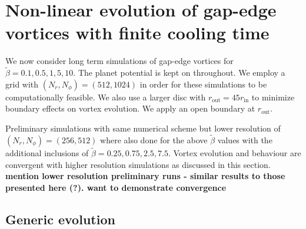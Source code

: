 
\section{Non-linear evolution of
  gap-edge vortices with finite cooling time}\label{nonlinear} 

We now consider long term simulations of gap-edge vortices for
$\tilde{\beta}=0.1,0.5,1,5,10$. The planet potential is kept on
throughout.  
We employ a grid with $(N_r,N_{\phi})=(512,1024)$ 
in order for these simulations to be computationally feasible. We also use a larger
disc with $r_{\mathrm{out}}=45r_{\mathrm{in}}$ to minimize boundary
effects on vortex evolution. We apply an open boundary at
$r_\mathrm{out}$.

Preliminary simulations with same numerical scheme but lower resolution of
 $(N_r,N_{\phi})=(256,512)$ where also done for the above $\tilde\beta$ values
with the additional inclusions of $\tilde{\beta}=0.25,0.75,2.5,7.5$.
Vortex evolution and behaviour are convergent with
higher resolution simulations as discussed in this section.
 {\bf mention lower resolution preliminary runs - 
similar results to those presented here (?). want to demonstrate convergence}





\subsection{Generic evolution}

